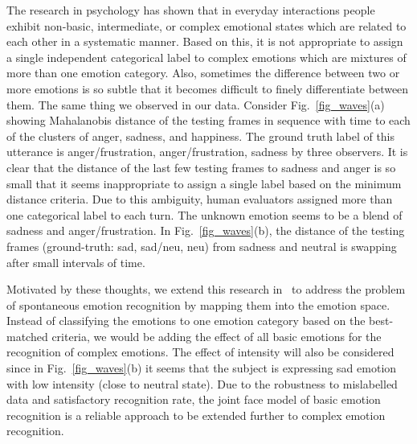 \documentclass[10pt,journal,cspaper,compsoc]{IEEEtran}
\begin{document}
The research in psychology has shown that in everyday interactions people exhibit non-basic, intermediate, or complex emotional states which are related to each other in a systematic manner. Based on this, it is not appropriate to assign a single independent categorical label to complex emotions which are mixtures of more than one emotion category.
Also, sometimes the difference between two or more emotions is so subtle that it becomes difficult to finely differentiate between them. The same thing we observed in our data. Consider Fig.~\ref{fig_waves}(a) showing Mahalanobis distance of the testing frames in sequence with time to each of the clusters of anger, sadness, and happiness. The ground truth label of this utterance is anger/frustration, anger/frustration, sadness by three observers. It is clear that the distance of the last few testing frames to sadness and anger is so small that it seems inappropriate to assign a single label based on the minimum distance criteria. Due to this ambiguity, human evaluators assigned more than one categorical label to each turn. The unknown emotion seems to be a blend of sadness and anger/frustration. In Fig.~\ref{fig_waves}(b), the distance of the testing frames (ground-truth: sad, sad/neu, neu) from sadness and neutral is swapping after small intervals of time. %

Motivated by these thoughts, we extend this research in~\cite{hakim2013vonmises} to address the problem of spontaneous emotion recognition by mapping them into the emotion space. Instead of classifying the emotions to one emotion category based on the best-matched criteria, we would be adding the effect of all basic emotions for the recognition of complex emotions. The effect of intensity will also be considered since in Fig.~\ref{fig_waves}(b) it seems that the subject is expressing sad emotion with low intensity (close to neutral state). Due to the robustness to mislabelled data and satisfactory recognition rate, the joint face model of basic emotion recognition is a reliable approach to be extended further to complex emotion recognition.
\end{document}
